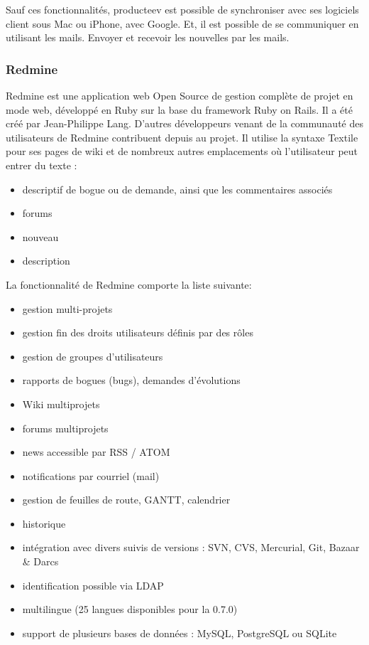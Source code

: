 Sauf ces fonctionnalités, producteev est possible de synchroniser avec ses logiciels client sous Mac ou iPhone, avec Google. Et, il est possible de se communiquer en utilisant les mails. Envoyer et recevoir les nouvelles par les mails. 


\subsubsection{Redmine} %
\label{ssub:redmine}


Redmine est une application web Open Source de gestion complète de projet en mode web, développé en Ruby sur la base du framework Ruby on Rails.
Il a été créé par Jean-Philippe Lang. D'autres développeurs venant de la communauté des utilisateurs de Redmine contribuent depuis au projet. Il utilise la syntaxe Textile pour ses pages de wiki et de nombreux autres emplacements où l'utilisateur peut entrer du texte : 
\begin{itemize}
	\item descriptif de bogue ou de demande, ainsi que les commentaires associés
	\item forums
	\item nouveau
	\item description
\end{itemize}

La fonctionnalité de Redmine comporte la liste suivante:
\begin{itemize}
	\item gestion multi-projets
	\item gestion fin des droits utilisateurs définis par des rôles
	\item gestion de groupes d'utilisateurs
	\item rapports de bogues (bugs), demandes d'évolutions
	\item Wiki multiprojets
	\item forums multiprojets
	\item news accessible par RSS / ATOM
	\item notifications par courriel (mail)
	\item gestion de feuilles de route, GANTT, calendrier
	\item historique
	\item intégration avec divers suivis de versions : SVN, CVS, Mercurial, Git, Bazaar \& Darcs
	\item identification possible via LDAP
	\item multilingue (25 langues disponibles pour la 0.7.0)
	\item support de plusieurs bases de données : MySQL, PostgreSQL ou SQLite
\end{itemize}

